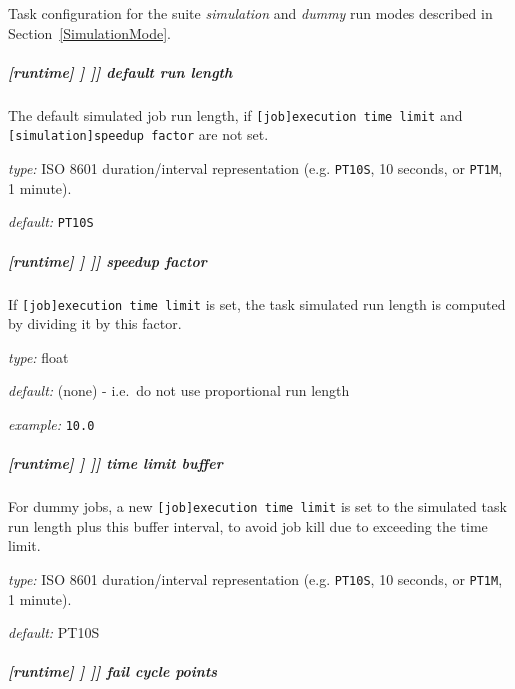 \lstset{language=transcript}

Task configuration for the suite {\em simulation} and {\em dummy} run modes
described in Section~\ref{SimulationMode}.

\subparagraph[default run length]{[runtime] \textrightarrow [[\_\_NAME\_\_]] \textrightarrow [[[simulation]]] \textrightarrow default run length}

The default simulated job run length, if \lstinline=[job]execution time limit=
and \lstinline=[simulation]speedup factor= are not set.

\begin{myitemize}
    \item {\em type:} ISO 8601 duration/interval representation (e.g.
 \lstinline=PT10S=, 10 seconds, or \lstinline=PT1M=, 1 minute).
    \item {\em default:} \lstinline=PT10S=
\end{myitemize}

\subparagraph[speedup factor]{[runtime] \textrightarrow [[\_\_NAME\_\_]] \textrightarrow [[[simulation]]] \textrightarrow speedup factor}

If \lstinline=[job]execution time limit= is set, the task simulated run length
is computed by dividing it by this factor.

\begin{myitemize}
    \item {\em type:} float
    \item {\em default:} (none) - i.e.\ do not use proportional run length
    \item {\em example:} \lstinline=10.0=
\end{myitemize}

\subparagraph[time limit buffer]{[runtime] \textrightarrow [[\_\_NAME\_\_]] \textrightarrow [[[simulation]]] \textrightarrow time limit buffer}

For dummy jobs, a new \lstinline=[job]execution time limit= is set to the
simulated task run length plus this buffer interval, to avoid job kill due to
exceeding the time limit.

\begin{myitemize}
    \item {\em type:} ISO 8601 duration/interval representation (e.g.
 \lstinline=PT10S=, 10 seconds, or \lstinline=PT1M=, 1 minute).
    \item {\em default:} PT10S
\end{myitemize}

\subparagraph[fail cycle points]{[runtime] \textrightarrow [[\_\_NAME\_\_]] \textrightarrow [[[simulation]]] \textrightarrow fail cycle points}

